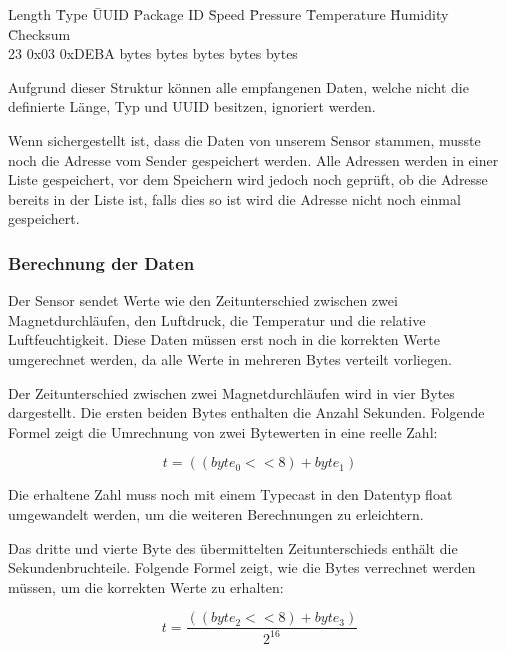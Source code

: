 
\begin{tabbing}
   Length	\quad\= Type	\quad\= UUID 	\quad\= Package ID	\quad\= Speed	\quad\= Pressure	\quad\= Temperature	\quad\= Humidity	\quad\= Checksum   \\[0.8ex]
   23	\> 0x03	\> 0xDEBA  bytes bytes bytes bytes bytes \\
\end{tabbing}
Aufgrund dieser Struktur können alle empfangenen Daten, welche nicht die definierte Länge, Typ und UUID besitzen, ignoriert werden.

Wenn sichergestellt ist, dass die Daten von unserem Sensor stammen, musste noch die Adresse vom Sender gespeichert werden. Alle Adressen werden in einer Liste gespeichert, vor dem Speichern wird jedoch noch geprüft, ob die Adresse bereits in der Liste ist, falls dies so ist wird die Adresse nicht noch einmal gespeichert.

\subsubsection{Berechnung der Daten}

Der Sensor sendet Werte wie den Zeitunterschied zwischen zwei Magnetdurchläufen, den Luftdruck, die Temperatur und die relative Luftfeuchtigkeit. Diese Daten müssen erst noch in die korrekten Werte umgerechnet werden, da alle Werte in mehreren Bytes verteilt vorliegen.

Der Zeitunterschied zwischen zwei Magnetdurchläufen wird in vier Bytes dargestellt. Die ersten beiden Bytes enthalten die Anzahl Sekunden. Folgende Formel zeigt die Umrechnung von zwei Bytewerten in eine reelle Zahl:

\begin{equation}
	t = ((byte_0 << 8) + byte_1)
\end{equation}

Die erhaltene Zahl muss noch mit einem Typecast in den Datentyp float umgewandelt werden, um die weiteren Berechnungen zu erleichtern.

Das dritte und vierte Byte des übermittelten Zeitunterschieds enthält die Sekundenbruchteile. Folgende Formel zeigt, wie die Bytes verrechnet werden müssen, um die korrekten Werte zu erhalten:

\begin{equation}
	t = \frac{((byte_2 << 8) + byte_3)}{2^{16}}
\end{equation}

